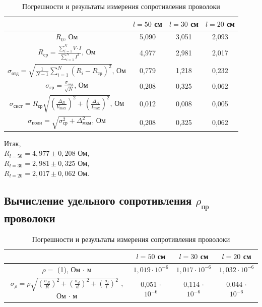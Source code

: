 \documentclass[a4paper]{article}
\begin{document}
\begin{table}[h]
\renewcommand{\arraystretch}{1.7} 
\caption{Погрешности и результаты измерения сопротивления проволоки}
\centering
\begin{tabular}{|c|c|c|c|}
\hline
& $l = 50$ см &  $l = 30$ см &   $l = 20$ см  \\
\hline
$R_0$, Ом  & 5,090 & 3,051 & 2,093 \\
\hline
$R_\text{ср} = \frac{\sum_{i=1}^{N}V \cdot I}{\sum_{i=1}^{N}I^2}$, Ом & 4,977 & 2,981 & 2,017 \\
\hline
$\sigma_\text{отд} = \sqrt{\frac{1}{N-1} \sum_{i=1}^{N} (R_i - R_\text{ср})^2} $, Ом  & 0,779  & 1,218 & 0,232 \\
\hline
$\sigma_\text{ср} = \frac{\sigma_\text{отд}}{\sqrt{N}} $, Ом  & 0,208  & 0,325 & 0,062 \\
\hline
$\sigma_\text{сист} = R_\text{ср} \sqrt{\left(\frac{\Delta_B}{V_{\text{max}}}\right)^2 + \left(\frac{\Delta_A}{I_{\text{max}}}\right)^2} $, Ом  & 0,012  & 0,008 & 0,005 \\
\hline
$\sigma_\text{полн} = \sqrt{\sigma_\text{ср}^2 + \Delta_\text{мкм}^2}$, Ом  & 0,208  & 0,325 & 0,062 \\
\hline
\end{tabular}
\end{table}
\raggedright

Итак, \\
$R_\text{$l=50$} = 4,977 \pm 0,208$ Ом, \\
$R_\text{$l=30$} = 2,981 \pm 0,325$ Ом, \\
$R_\text{$l=20$} = 2,017 \pm 0,062$ Ом. \\

\subsection{Вычисление удельного сопротивления $\rho_\text{пр}$ проволоки}

\begin{table}[h]
\renewcommand{\arraystretch}{1.7} 
\caption{Погрешности и результаты измерения сопротивления проволоки}
\centering
\begin{tabular}{|c|c|c|c|}
\hline
& $l = 50$ см &  $l = 30$ см &   $l = 20$ см  \\
\hline
$\rho = $ (1), Ом $\cdot$ м  & $1,019 \cdot 10^{-6} $ & $1,017 \cdot 10^{-6} $ & $1,032 \cdot 10^{-6} $ \\
\hline
$ \sigma_\rho = \rho\sqrt{\left( \frac{\sigma_R}{R} \right)^2 +\left( \frac{\sigma_d}{d} \right )^2 + \left( \frac{\sigma_l}{l} \right )^2} $
, Ом $\cdot$ м & 0,051 $\cdot$ $10^{-6}$ & 0,114 $\cdot$ $10^{-6}$  & 0,044 $\cdot$ $10^{-6}$ \\
\hline
\end{tabular}
\end{table}
\raggedright
\end{document}

